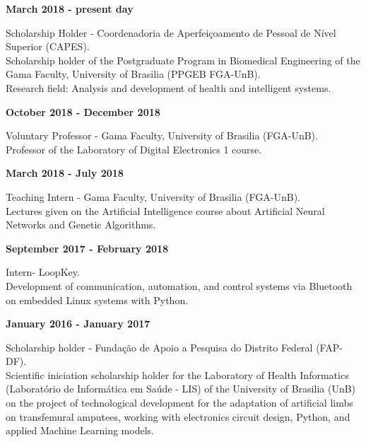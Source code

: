 \documentclass[11pt]{article}
\begin{document}
\textbf{March 2018 - present day}
\begin{addmargin}{0.5cm}
Scholarship Holder - Coordenadoria de Aperfeiçoamento de Pessoal de Nível Superior (CAPES). \\
Scholarship holder of the Postgraduate Program in Biomedical Engineering of the
Gama Faculty, University of Brasilia (PPGEB FGA-UnB).\\
Research field: Analysis and development of health and intelligent systems.\\
\end{addmargin}

\textbf{October 2018 - December 2018}
\begin{addmargin}{0.5cm}
Voluntary Professor -  Gama Faculty, University of Brasilia (FGA-UnB).\\
Professor of the Laboratory of Digital Electronics 1 course. \\
\end{addmargin}

\textbf{March 2018 - July 2018}
\begin{addmargin}{0.5cm}
Teaching Intern - Gama Faculty, University of Brasilia (FGA-UnB).\\
Lectures given on the Artificial Intelligence  course  about Artificial Neural Networks
and Genetic Algorithms. \\
\end{addmargin}

\textbf{September 2017 - February 2018}
\begin{addmargin}{0.5cm}
Intern- LoopKey.\\
Development of communication, automation, and control systems via Bluetooth on
embedded Linux systems with Python. \\
\end{addmargin}

\newpage

\textbf{January 2016 - January 2017}
\begin{addmargin}{0.5cm}
Scholarship holder - Fundação de Apoio a Pesquisa do Distrito Federal (FAP-DF).\\
Scientific iniciation scholarship holder for the Laboratory of Health Informatics
(Laboratório de Informática em Saúde - LIS) of the University of
Brasilia (UnB) on the project of technological development for the adaptation of artificial
limbs on transfemural amputees, working with electronics circuit design, Python, and applied
Machine Learning models. \\

\end{addmargin}
\end{document}
